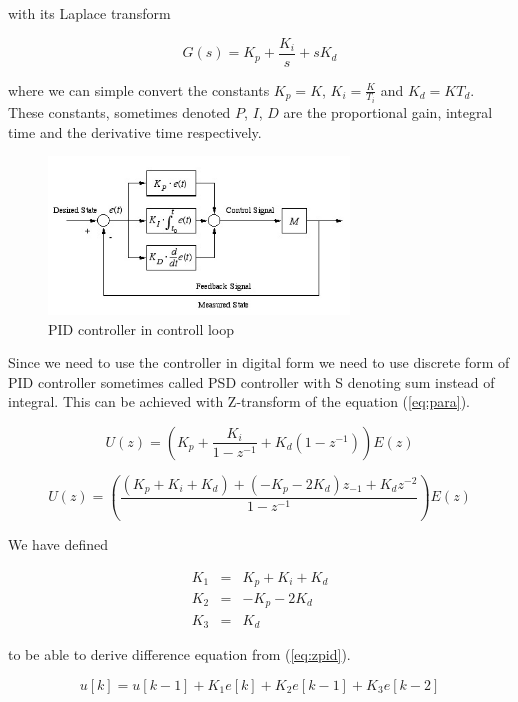 \documentclass{article}
\begin{document}
\noindent with its Laplace transform

\begin{equation}
    G(s) = K_p + \frac{K_i}{s} + sK_d
\end{equation}

\noindent where we can simple convert the constants $K_p = K$, $K_i =
\frac{K}{T_i}$ and $K_d = KT_d$. These constants, sometimes denoted $P$, $I$, $D$ are the proportional gain,
integral time and the derivative time respectively.

\begin{figure}[h]
    \centering
    \includegraphics[width=8cm]{pid}
    \caption{PID controller in controll loop \cite{pidpic}}
    \label{fig:pidpic}
\end{figure}

Since we need to use the controller in digital form we need to use discrete form
of PID controller sometimes called PSD controller with S denoting sum instead of
integral. This can be achieved with Z-transform of the equation (\ref{eq:para}).
\cite{zt}

\begin{equation}
    U(z) = \left( K_p + \frac{K_i}{1-z^{-1}} + K_d\left(1-z^{-1}\right) \right)E(z)
\end{equation}

\begin{equation} \label{eq:zpid}
    U(z) = \left( \frac{\left( K_p + K_i + K_d\right) + \left(
    -K_p-2K_d\right)z_{-1} + K_dz^{-2}}{1-z^{-1}} \right)E(z)
\end{equation}

\noindent We have defined

\begin{eqnarray*}
    K_1 &=& K_p + K_i + K_d \\
    K_2 &=& -K_p-2K_d \\
    K_3 &=& K_d
\end{eqnarray*}

\noindent to be able to derive difference equation from (\ref{eq:zpid}).

\begin{equation}
    u[k] = u[k-1] + K_1e[k]+K_2e[k-1]+K_3e[k-2]
\end{equation}
\end{document}
